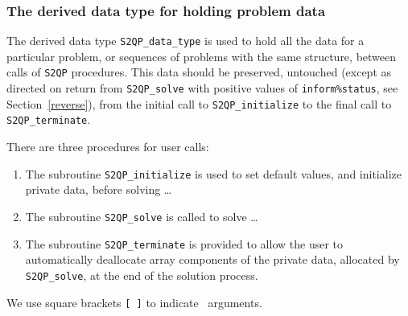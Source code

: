 \documentclass{galahad}
\newcommand{\packagename}{S2QP}
\begin{document}
\begin{description}






\end{description}


\subsubsection{The derived data type for holding problem data}\label{typedata}
The derived data type 
{\tt \packagename\_data\_type}
is used to hold all the data for a particular problem,
or sequences of problems with the same structure, between calls of 
{\tt \packagename} procedures. 
This data should be preserved, untouched (except as directed on
return from {\tt \packagename\_solve} with positive values of
{\tt inform\%status}, see Section~\ref{reverse}),
from the initial call to 
{\tt \packagename\_initialize}
to the final call to
{\tt \packagename\_terminate}.


\galarguments
There are three procedures for user calls:

\begin{enumerate}
\item The subroutine 
      {\tt \packagename\_initialize} 
      is used to set default values, and initialize private data, 
      before solving \ldots
\item The subroutine 
      {\tt \packagename\_solve} 
      is called to solve \ldots
\item The subroutine 
      {\tt \packagename\_terminate} 
      is provided to allow the user to automatically deallocate array 
       components of the private data, allocated by 
       {\tt \packagename\_solve}, 
       at the end of the solution process. 
\end{enumerate}
We use square brackets {\tt [ ]} to indicate \optional\ arguments.
\end{document}
